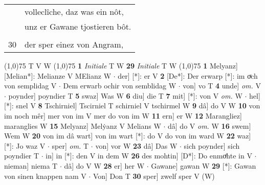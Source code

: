 \documentclass[8pt,a4paper,notitlepage]{article}
\begin{document}
\begin{table}[ht]
\begin{minipage}[t]{0.5\linewidth}
\begin{tabular}{rl}
 & volleclîche, daz was ein nôt,\\ 
 & unz er Gawane tjostieren bôt.\\ 
 & \textbf{\textit{\begin{large}V\end{large}}on sînen knappen er dô} nam\\ 
30 & der sper einez von Angram,\\ 
\end{tabular}
\scriptsize
\line(1,0){75} \newline
T V W \newline
\line(1,0){75} \newline
\textbf{1} \textit{Initiale} T W  \textbf{29} \textit{Initiale} T W  \newline
\line(1,0){75} \newline
\textbf{1} Melyanz] [Melian*]: Melianze V MElianz W  $\cdot$ der] [*]: er V \textbf{2} [De*]: Der erwarp [*]: im oͮch von semplidag V  $\cdot$ Dem erwarb ochir von semblidag W  $\cdot$ von] vo T \textbf{4} unde] \textit{om.} V  $\cdot$ poynder] poyndier T \textbf{5} swaz] Was W \textbf{6} diu] die T \textbf{7} mit] [*]: von V \textit{om.} W  $\cdot$ hel] [*]: snel V \textbf{8} Tschirniel] Tscirniel T schirniel V tschirmel W \textbf{9} dâ] do V W \textbf{10} von im noch mêr] mer von im V mer do von im W \textbf{11} ern] er W \textbf{12} Marangliez] maranglies W \textbf{15} Melyanz] Melẏanz V Melians W  $\cdot$ dâ] do V \textit{om.} W \textbf{16} swem] Wem W \textbf{20} von im dâ wart] von im wart [*]: do V do von im ward W \textbf{22} waz] [*]: Jo waz V  $\cdot$ sper] \textit{om.} T  $\cdot$ von] vor W \textbf{23} dâ] Das W  $\cdot$ sich poynder] sich poyndier T  $\cdot$ in] in [*]: den V in dem W \textbf{26} des mohtin] [D*]: Do enmoͤhte in V  $\cdot$ nieman] niema T  $\cdot$ dâ] do V W \textbf{28} er] her W  $\cdot$ Gawane] gawan W \textbf{29} [*]: Gawan von sinen knappen nam V  $\cdot$ Von] Don T \textbf{30} sper] zwelf sper V (W) \newline
\end{minipage}
\end{table}
\end{document}
